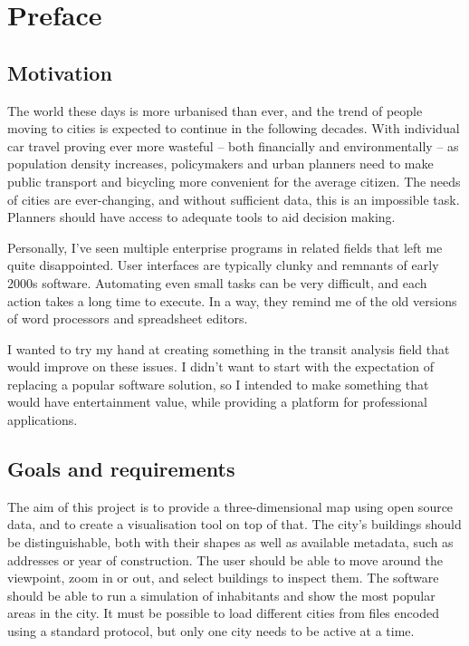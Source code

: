 \chapter{Preface}

\section{Motivation}

The world these days is more urbanised than ever, and the trend of people moving to cities is expected to continue in the following decades. With individual car travel proving ever more wasteful -- both financially and environmentally -- as population density increases, policymakers and urban planners need to make public transport and bicycling more convenient for the average citizen. The needs of cities are ever-changing, and without sufficient data, this is an impossible task. Planners should have access to adequate tools to aid decision making.

Personally, I've seen multiple enterprise programs in related fields that left me quite disappointed. User interfaces are typically clunky and remnants of early 2000s software. Automating even small tasks can be very difficult, and each action takes a long time to execute. In a way, they remind me of the old versions of word processors and spreadsheet editors.

I wanted to try my hand at creating something in the transit analysis field that would improve on these issues. I didn't want to start with the expectation of replacing a popular software solution, so I intended to make something that would have entertainment value, while providing a platform for professional applications.


\section{Goals and requirements}

The aim of this project is to provide a three-dimensional map using open source data, and to create a visualisation tool on top of that. The city's buildings should be distinguishable, both with their shapes as well as available metadata, such as addresses or year of construction. The user should be able to move around the viewpoint, zoom in or out, and select buildings to inspect them. The software should be able to run a simulation of inhabitants and show the most popular areas in the city. It must be possible to load different cities from files encoded using a standard protocol, but only one city needs to be active at a time.

